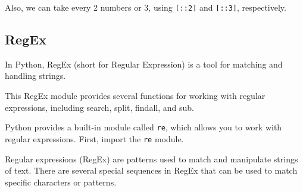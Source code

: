 \documentclass[../../data_analysis_python.tex]{subfiles}
\begin{document}
    Also, we can take every 2 numbers or 3, using \lstinline|[::2]| and \lstinline|[::3]|, respectively.

    \subsection{RegEx}

    In Python, RegEx (short for Regular Expression) is a tool for matching and handling strings.

    This RegEx module provides several functions for working with regular expressions, including search, split, findall, and sub.

    Python provides a built-in module called \lstinline|re|, which allows you to work with regular expressions. First, import the \lstinline|re| module.

    \begin{obs}
        Regular expressions (RegEx) are patterns used to match and manipulate strings of text. There are several special sequences in RegEx that can be used to match specific characters or patterns.
    \end{obs}
\end{document}
